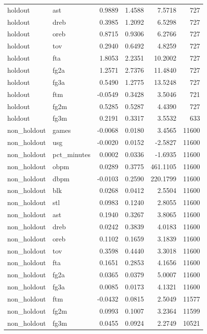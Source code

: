 \begin{table}
\begin{tabular}{llrrrr}
holdout & ast & 0.9889 & 1.4588 & 7.5718 & 727 \\
holdout & dreb & 0.3985 & 1.2092 & 6.5298 & 727 \\
holdout & oreb & 0.8715 & 0.9306 & 6.2766 & 727 \\
holdout & tov & 0.2940 & 0.6492 & 4.8259 & 727 \\
holdout & fta & 1.8053 & 2.2351 & 10.2002 & 727 \\
holdout & fg2a & 1.2571 & 2.7376 & 11.4840 & 727 \\
holdout & fg3a & 0.5490 & 1.2775 & 13.5248 & 727 \\
holdout & ftm & -0.0549 & 0.3428 & 3.5046 & 721 \\
holdout & fg2m & 0.5285 & 0.5287 & 4.4390 & 727 \\
holdout & fg3m & 0.2191 & 0.3317 & 3.5532 & 633 \\
non\_holdout & games & -0.0068 & 0.0180 & 3.4565 & 11600 \\
non\_holdout & usg & -0.0020 & 0.0152 & -2.5827 & 11600 \\
non\_holdout & pct\_minutes & 0.0002 & 0.0336 & -1.6935 & 11600 \\
non\_holdout & obpm & 0.0289 & 0.3775 & 461.1105 & 11600 \\
non\_holdout & dbpm & -0.0103 & 0.2590 & 220.1799 & 11600 \\
non\_holdout & blk & 0.0268 & 0.0412 & 2.5504 & 11600 \\
non\_holdout & stl & 0.0983 & 0.1240 & 2.8055 & 11600 \\
non\_holdout & ast & 0.1940 & 0.3267 & 3.8065 & 11600 \\
non\_holdout & dreb & 0.0242 & 0.3839 & 4.0183 & 11600 \\
non\_holdout & oreb & 0.1102 & 0.1659 & 3.1839 & 11600 \\
non\_holdout & tov & 0.3598 & 0.4440 & 3.3018 & 11600 \\
non\_holdout & fta & 0.1651 & 0.2853 & 4.1656 & 11600 \\
non\_holdout & fg2a & 0.0365 & 0.0379 & 5.0007 & 11600 \\
non\_holdout & fg3a & 0.0085 & 0.0173 & 4.1321 & 11600 \\
non\_holdout & ftm & -0.0432 & 0.0815 & 2.5049 & 11577 \\
non\_holdout & fg2m & 0.0993 & 0.1007 & 3.2364 & 11599 \\
non\_holdout & fg3m & 0.0455 & 0.0924 & 2.2749 & 10521 \\
\bottomrule
\end{tabular}
\end{table}
